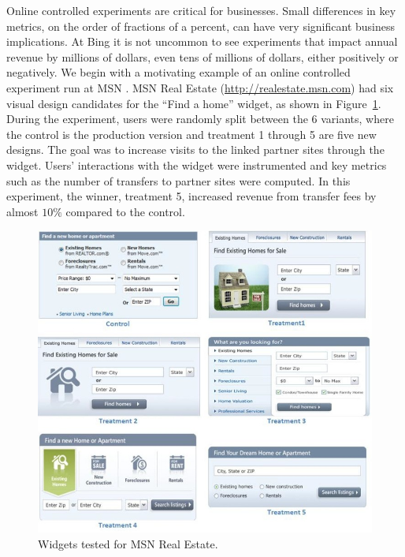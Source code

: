 \documentclass{sig-alternate}
\begin{document}
Online controlled experiments are critical for businesses. \linebreak Small differences in key metrics, on the order of fractions of a percent, can have very significant business implications.  At Bing it is not uncommon to see experiments that impact annual revenue by millions of dollars, even tens of millions of dollars, either positively or negatively. 
We begin with a motivating example of an online controlled experiment run at MSN \citep{expAtMicrosoft}. MSN Real Estate (\url{http://realestate.msn.com}) had six visual design candidates for the ``Find a home'' widget, as shown in Figure~\ref{fig:msn}. During the experiment, users were randomly split between the 6 variants, where the control is the production version and treatment 1 through 5 are five new designs. The goal was to increase visits to the linked partner sites through the widget. Users' interactions with the widget were instrumented and key metrics such as the number of transfers to partner sites were computed.  In this experiment, the winner, treatment 5, increased revenue from transfer fees by almost $10\%$ compared to the control. 
\begin{figure}[!hbtp]
  \centering
  \includegraphics[width=.5\textwidth]{msn}
  \caption{Widgets tested for MSN Real Estate.}
  \label{fig:msn}
\end{figure}
\end{document}
